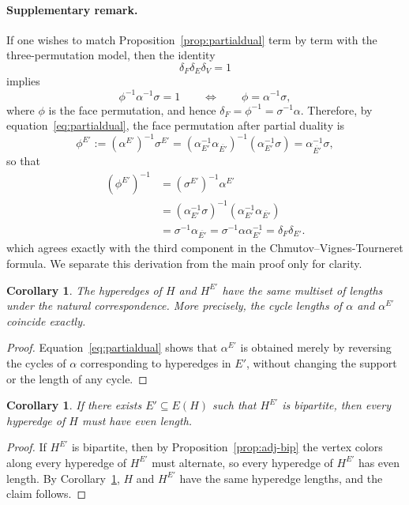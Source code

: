 \documentclass{article}
\newtheorem{corollary}[theorem]{Corollary}
\begin{document}
\paragraph{Supplementary remark.}
If one wishes to match Proposition~\ref{prop:partialdual} term by term with the three-permutation model, then the identity
\[
\delta_F\delta_E\delta_V=1
\]
implies
\[
\phi^{-1}\alpha^{-1}\sigma=1
\qquad\Longleftrightarrow\qquad
\phi=\alpha^{-1}\sigma,
\]
where $\phi$ is the face permutation, and hence $\delta_F=\phi^{-1}=\sigma^{-1}\alpha$. Therefore, by equation~\eqref{eq:partialdual}, the face permutation after partial duality is
\[
\phi^{E'}:=(\alpha^{E'})^{-1}\sigma^{E'}
=(\alpha_{E'}^{-1}\alpha_{\overline{E'}})^{-1}(\alpha_{E'}^{-1}\sigma)
=\alpha_{\overline{E'}}^{-1}\sigma,
\]
so that
\[
\begin{aligned}
(\phi^{E'})^{-1}
&=(\sigma^{E'})^{-1}\alpha^{E'} \\
&=(\alpha_{E'}^{-1}\sigma)^{-1}(\alpha_{E'}^{-1}\alpha_{\overline{E'}}) \\
&=\sigma^{-1}\alpha_{\overline{E'}}
=\sigma^{-1}\alpha\alpha_{E'}^{-1}
=\delta_F\delta_{E'}.
\end{aligned}
\]
which agrees exactly with the third component in the Chmutov--Vignes-Tourneret formula. We separate this derivation from the main proof only for clarity.

\begin{corollary}\label{cor:length-preserved}
The hyperedges of $H$ and $H^{E'}$ have the same multiset of lengths under the natural correspondence. More precisely, the cycle lengths of $\alpha$ and $\alpha^{E'}$ coincide exactly.
\end{corollary}
\begin{proof}
Equation~\eqref{eq:partialdual} shows that $\alpha^{E'}$ is obtained merely by reversing the cycles of $\alpha$ corresponding to hyperedges in $E'$, without changing the support or the length of any cycle.
\end{proof}

\begin{corollary}\label{cor:odd-obstruction}
If there exists $E'\subseteq E(H)$ such that $H^{E'}$ is bipartite, then every hyperedge of $H$ must have even length.
\end{corollary}
\begin{proof}
If $H^{E'}$ is bipartite, then by Proposition~\ref{prop:adj-bip} the vertex colors along every hyperedge of $H^{E'}$ must alternate, so every hyperedge of $H^{E'}$ has even length. By Corollary~\ref{cor:length-preserved}, $H$ and $H^{E'}$ have the same hyperedge lengths, and the claim follows.
\end{proof}
\end{document}
